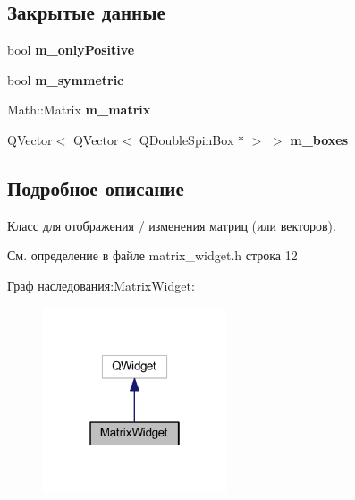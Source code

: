 \subsection*{Закрытые данные}
\begin{DoxyCompactItemize}
\item 
\hypertarget{class_matrix_widget_a82f2f645dfe6a61844cbcaa7b9d74c5f}{}\label{class_matrix_widget_a82f2f645dfe6a61844cbcaa7b9d74c5f} 
bool {\bfseries m\+\_\+only\+Positive}
\item 
\hypertarget{class_matrix_widget_ad3c5c9a7eb76b52d92ff88e5aac69df8}{}\label{class_matrix_widget_ad3c5c9a7eb76b52d92ff88e5aac69df8} 
bool {\bfseries m\+\_\+symmetric}
\item 
\hypertarget{class_matrix_widget_a45e4733316b0de574c8f333e3f89bd4c}{}\label{class_matrix_widget_a45e4733316b0de574c8f333e3f89bd4c} 
Math\+::\+Matrix {\bfseries m\+\_\+matrix}
\item 
\hypertarget{class_matrix_widget_ab3a0c3c5c847e0a35aa23a6a7e7d56f6}{}\label{class_matrix_widget_ab3a0c3c5c847e0a35aa23a6a7e7d56f6} 
Q\+Vector$<$ Q\+Vector$<$ Q\+Double\+Spin\+Box $\ast$ $>$ $>$ {\bfseries m\+\_\+boxes}
\end{DoxyCompactItemize}


\subsection{Подробное описание}
Класс для отображения / изменения матриц (или векторов). 

См. определение в файле matrix\+\_\+widget.\+h строка 12



Граф наследования\+:Matrix\+Widget\+:
\nopagebreak
\begin{figure}[H]
\begin{center}
\leavevmode
\includegraphics[width=154pt]{class_matrix_widget__inherit__graph}
\end{center}
\end{figure}


